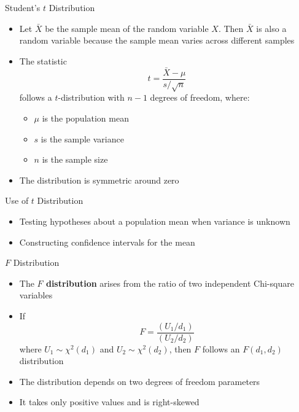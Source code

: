 \documentclass[12pt, aspectratio=169]{beamer}
\begin{document}
    \begin{frame}{Student's \(t\) Distribution}
        \begin{itemize}
            \item Let \(\bar{X}\) be the sample mean of the random variable \(X\). Then \(\bar{X}\) is also a random variable because the sample mean varies across different samples
            \item The statistic
            \[
                t = \frac{\bar{X} - \mu}{s/\sqrt{n}}
            \]
            follows a \(t\)-distribution with \(n-1\) degrees of freedom, where:
            \begin{itemize}
                \item \(\mu\) is the population mean
                \item \(s\) is the sample variance
                \item \(n\) is the sample size
            \end{itemize}
            \item The distribution is symmetric around zero
        \end{itemize}
    \end{frame}


    \begin{frame}{Use of \(t\) Distribution}
        \begin{itemize}
            \item Testing hypotheses about a population mean when variance is unknown
            \item Constructing confidence intervals for the mean
        \end{itemize}
    \end{frame}


    \begin{frame}{\(F\) Distribution}
        \begin{itemize}
            \item The \textbf{\(F\) distribution} arises from the ratio of two independent Chi-square variables
            \item If
            \[
                F = \frac{(U_1 / d_1)}{(U_2 / d_2)}
            \]
            where \(U_1 \sim \chi^2(d_1)\) and \(U_2 \sim \chi^2(d_2)\), then \(F\) follows an \(F(d_1,d_2)\) distribution
            \item The distribution depends on two degrees of freedom parameters
            \item It takes only positive values and is right-skewed
        \end{itemize}
    \end{frame}
\end{document}
